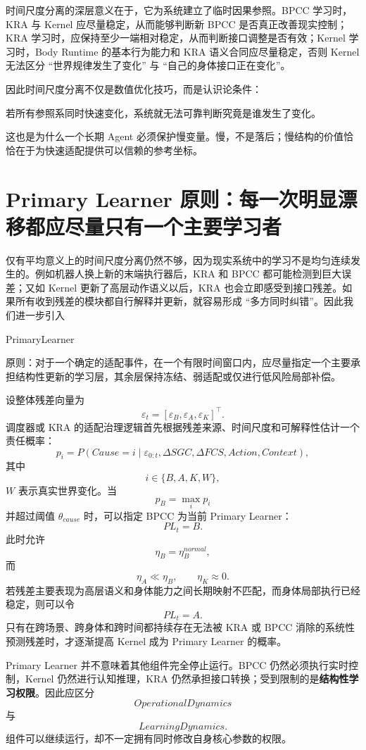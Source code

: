 时间尺度分离的深层意义在于，它为系统建立了临时因果参照。BPCC 学习时，KRA 与 Kernel 应尽量稳定，从而能够判断新 BPCC 是否真正改善现实控制；KRA 学习时，应保持至少一端相对稳定，从而判断接口调整是否有效；Kernel 学习时，Body Runtime 的基本行为能力和 KRA 语义合同应尽量稳定，否则 Kernel 无法区分 ``世界规律发生了变化'' 与 ``自己的身体接口正在变化''。

因此时间尺度分离不仅是数值优化技巧，而是认识论条件：
\begin{statementbox}
若所有参照系同时快速变化，系统就无法可靠判断究竟是谁发生了变化。
\end{statementbox}
这也是为什么一个长期 Agent 必须保护慢变量。慢，不是落后；慢结构的价值恰恰在于为快速适配提供可以信赖的参考坐标。

\section{Primary Learner 原则：每一次明显漂移都应尽量只有一个主要学习者}

仅有平均意义上的时间尺度分离仍然不够，因为现实系统中的学习不是均匀连续发生的。例如机器人换上新的末端执行器后，KRA 和 BPCC 都可能检测到巨大误差；又如 Kernel 更新了高层动作语义以后，KRA 也会立即感受到接口残差。如果所有收到残差的模块都自行解释并更新，就容易形成 ``多方同时纠错''。因此我们进一步引入
\begin{statementbox}
PrimaryLearner
\end{statementbox}
原则：对于一个确定的适配事件，在一个有限时间窗口内，应尽量指定一个主要承担结构性更新的学习层，其余层保持冻结、弱适配或仅进行低风险局部补偿。

设整体残差向量为
\[
\varepsilon_t
=
\left[
\varepsilon_B,
\varepsilon_A,
\varepsilon_K
\right]^{\top}.
\]
调度器或 KRA 的适配治理逻辑首先根据残差来源、时间尺度和可解释性估计一个责任概率：
\[
p_i
=
P
\left(
Cause=i
\mid
\varepsilon_{0:t},
\Delta SGC,
\Delta FCS,
Action,
Context
\right),
\]
其中
\[
i\in\{B,A,K,W\},
\]
$W$ 表示真实世界变化。当
\[
p_B
=
\max_i p_i
\]
并超过阈值 $\theta_{cause}$ 时，可以指定 BPCC 为当前 Primary Learner：
\[
PL_t=B.
\]
此时允许
\[
\eta_B=\eta_B^{normal},
\]
而
\[
\eta_A\ll\eta_B,
\qquad
\eta_K\approx 0.
\]
若残差主要表现为高层语义和身体能力之间长期映射不匹配，而身体局部执行已经稳定，则可以令
\[
PL_t=A.
\]
只有在跨场景、跨身体和跨时间都持续存在无法被 KRA 或 BPCC 消除的系统性预测残差时，才逐渐提高 Kernel 成为 Primary Learner 的概率。

Primary Learner 并不意味着其他组件完全停止运行。BPCC 仍然必须执行实时控制，Kernel 仍然进行认知推理，KRA 仍然承担接口转换；受到限制的是\textbf{结构性学习权限}。因此应区分
\[
OperationalDynamics
\]
与
\[
LearningDynamics.
\]
组件可以继续运行，却不一定拥有同时修改自身核心参数的权限。

